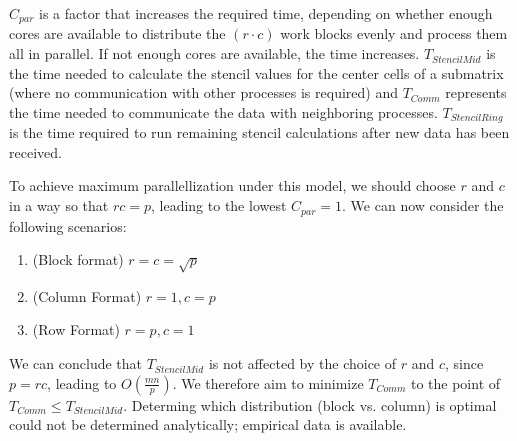 \documentclass[11pt]{article}
\begin{document}
$C_{par}$ is a factor that increases the required time, depending on whether enough cores are available to distribute the $(r \cdot c)$ work blocks evenly and process them all in parallel. If not enough cores are available, the time increases. $T_{StencilMid}$ is the time needed to calculate the stencil values for the center cells of a submatrix (where no communication with other processes is required) and $T_{Comm}$ represents the time needed to communicate the data with neighboring processes. $T_{StencilRing}$ is the time required to run remaining stencil calculations after new data has been received.

To achieve maximum parallellization under this model, we should choose $r$ and $c$ in a way so that $rc = p$, leading to the lowest $C_{par} = 1$. We can now consider the following scenarios:

\begin{enumerate}
\item (Block format) $r = c = \sqrt{p}$ 
\item (Column Format) $r = 1, c = p$
\item (Row Format) $r = p, c = 1$
\end{enumerate}

We can conclude that $T_{StencilMid}$ is not affected by the choice of $r$ and $c$, since $p = rc$, leading to $O(\frac{mn}{p})$. We therefore aim to minimize $T_{Comm}$ to the point of $T_{Comm} \leq T_{StencilMid}$. Determing which distribution (block vs. column) is optimal could not be determined analytically; empirical data is available.
\end{document}
